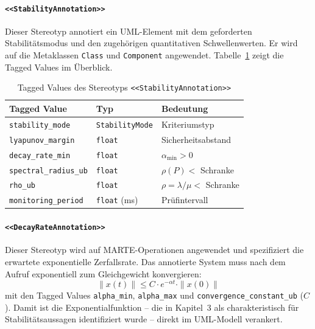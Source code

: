﻿\documentclass[a4paper,12pt]{scrreprt}
\theoremstyle{definition}
\begin{document}
\paragraph{\texttt{<<StabilityAnnotation>>}}

Dieser Stereotyp annotiert ein UML-Element mit dem geforderten
Stabilitätsmodus und den zugehörigen quantitativen Schwellenwerten.
Er wird auf die Metaklassen \texttt{Class} und \texttt{Component}
angewendet. Tabelle~\ref{tab:stability-annotation} zeigt die Tagged Values
im Überblick.

\begin{table}[H]
	\centering
	\begin{tabular}{@{}lll@{}}
		\toprule
		\textbf{Tagged Value} & \textbf{Typ} & \textbf{Bedeutung} \\
		\midrule
		\texttt{stability\_mode}      & \texttt{StabilityMode} & Kriteriumstyp \\
		\texttt{lyapunov\_margin}     & \texttt{float}         & Sicherheitsabstand \\
		\texttt{decay\_rate\_min}     & \texttt{float}         & $\alpha_{\min} > 0$ \\
		\texttt{spectral\_radius\_ub} & \texttt{float}         & $\rho(P) <$ Schranke \\
		\texttt{rho\_ub}              & \texttt{float}         & $\rho = \lambda/\mu <$ Schranke \\
		\texttt{monitoring\_period}   & \texttt{float} (ms)    & Prüfintervall \\
		\bottomrule
	\end{tabular}
	\caption{Tagged Values des Stereotyps \texttt{<<StabilityAnnotation>>}}
	\label{tab:stability-annotation}
\end{table}

\paragraph{\texttt{<<DecayRateAnnotation>>}}

Dieser Stereotyp wird auf MARTE-Operationen angewendet und spezifiziert die
erwartete exponentielle Zerfallsrate. Das annotierte System muss nach dem
Aufruf exponentiell zum Gleichgewicht konvergieren:
\[
\|x(t)\| \leq C \cdot e^{-\alpha t} \cdot \|x(0)\|
\]
mit den Tagged Values \texttt{alpha\_min}, \texttt{alpha\_max} und
\texttt{convergence\_constant\_ub} ($C$). Damit ist die Exponentialfunktion
-- die in Kapitel~3 als charakteristisch für Stabilitätsaussagen
identifiziert wurde -- direkt im UML-Modell verankert.
\end{document}
